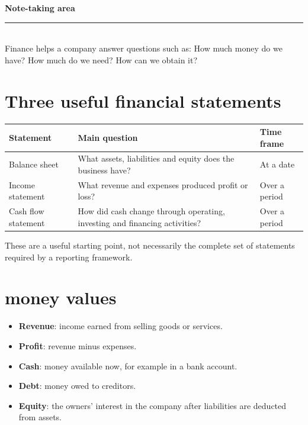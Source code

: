 \documentclass[12pt,a4paper]{report}
\begin{document}
\begin{minipage}[t]{0.69\textwidth}
    \textbf{Note-taking area}\\[0.5em]
    \rule{\linewidth}{0.4pt}
\\Finance helps a company answer questions such as: How much money do we have? How much do we need? How can we obtain it?
\section{Three useful financial statements}
\vspace{-2mm}
\begin{center}
\footnotesize
\begin{tabularx}{\linewidth}{@{}>{\raggedright\arraybackslash}p{.26\linewidth}>{\raggedright\arraybackslash}X>{\raggedright\arraybackslash}p{.18\linewidth}@{}}
\toprule
Statement & Main question & Time frame \\
\midrule
Balance sheet & What assets, liabilities and equity does the business have? & At a date \\
Income statement & What revenue and expenses produced profit or loss? & Over a period \\
Cash flow statement & How did cash change through operating, investing and financing activities? & Over a period \\
\bottomrule
\end{tabularx}
\end{center}
These are a useful starting point, not necessarily the complete set of statements required by a reporting framework.

\section{money values}
\begin{itemize}
    \item \textbf{Revenue}: income earned from selling goods or services.
    \item \textbf{Profit}: revenue minus expenses.
    \item \textbf{Cash}: money available now, for example in a bank account.
    \item \textbf{Debt}: money owed to creditors.
    \item \textbf{Equity}: the owners' interest in the company after liabilities are deducted from assets.
\end{itemize}
   
\end{minipage}
\end{document}
